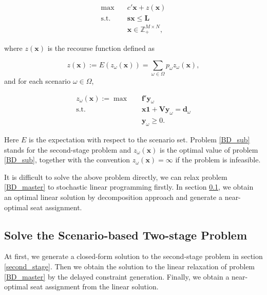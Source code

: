 \begin{equation}\label{BD_master}
  \begin{aligned}
\max \quad & c{'} \mathbf{x}+ z(\mathbf{x}) \\
\text {s.t.} \quad & \mathbf{s} \mathbf{x} \leq \mathbf{L} \\
& \mathbf{x} \in \mathbb{Z}_{+}^{M \times N},
\end{aligned}
\end{equation}

where $z(\mathbf{x})$ is the recourse function defined as 

$$z(\mathbf{x}) := E(z_{\omega}(\mathbf{x})) = \sum_{\omega \in \Omega} p_{\omega} z_{\omega}(\mathbf{x}),$$ and for each scenario $\omega \in \Omega$, 

\begin{equation}\label{BD_sub}
  \begin{aligned}
    z_{\omega}(\mathbf{x}) := \max \quad & \mathbf{f}{'} \mathbf{y}_{\omega} \\
    \text {s.t.} \quad & \mathbf{x} \mathbf{1} + \mathbf{V} \mathbf{y}_{\omega} = \mathbf{d}_{\omega} \\
     & \mathbf{y}_{\omega} \geq 0.
  \end{aligned}
  \end{equation}


Here $E$ is the expectation with respect to the scenario set. Problem \eqref{BD_sub} stands for the second-stage problem and $z_{\omega}(\mathbf{x})$ is the optimal value of problem \eqref{BD_sub}, together with the convention $z_{\omega}(\mathbf{x}) = \infty$ if the problem is infeasible.

It is difficult to solve the above problem directly, we can relax problem \eqref{BD_master} to stochastic linear programming firstly. In section \ref{solve_by_benders}, we obtain an optimal linear solution by decomposition approach and generate a near-optimal seat assignment.

\subsection{Solve the Scenario-based Two-stage Problem}\label{solve_by_benders}

At first, we generate a closed-form solution to the second-stage problem in section \ref{second_stage}. Then we obtain the solution to the linear relaxation of problem \eqref{BD_master} by the delayed constraint generation. Finally, we obtain a near-optimal seat assignment from the linear solution.


